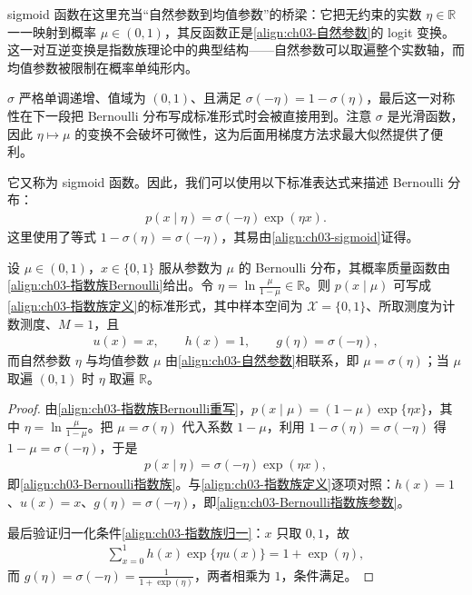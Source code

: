 \documentclass[../../main.tex]{subfiles}
\begin{document}
\begin{remark}
sigmoid 函数在这里充当“自然参数到均值参数”的桥梁：它把无约束的实数 $\eta\in\mathbb{R}$ 一一映射到概率 $\mu\in(0,1)$，其反函数正是\eqref{align:ch03-自然参数}的 logit 变换。这一对互逆变换是指数族理论中的典型结构——自然参数可以取遍整个实数轴，而均值参数被限制在概率单纯形内。

$\sigma$ 严格单调递增、值域为 $(0,1)$、且满足 $\sigma(-\eta)=1-\sigma(\eta)$，最后这一对称性在下一段把 Bernoulli 分布写成标准形式时会被直接用到。注意 $\sigma$ 是光滑函数，因此 $\eta\mapsto\mu$ 的变换不会破坏可微性，这为后面用梯度方法求最大似然提供了便利。
\end{remark}

它又称为 sigmoid 函数。因此，我们可以使用以下标准表达式来描述 Bernoulli 分布：
\begin{align}
p(x\mid\eta)=\sigma(-\eta)\exp(\eta x).
\label{align:ch03-Bernoulli指数族}
\end{align}
这里使用了等式 $1-\sigma(\eta)=\sigma(-\eta)$，其易由\eqref{align:ch03-sigmoid}证得。

\begin{proposition}\label{proposition:ch03-Bernoulli指数族}
设 $\mu\in(0,1)$，$x\in\{0,1\}$ 服从参数为 $\mu$ 的 Bernoulli 分布，其概率质量函数由\eqref{align:ch03-指数族Bernoulli}给出。令 $\eta=\ln\frac{\mu}{1-\mu}\in\mathbb{R}$。则 $p(x\mid\mu)$ 可写成\eqref{align:ch03-指数族定义}的标准形式，其中样本空间为 $\mathcal{X}=\{0,1\}$、所取测度为计数测度、$M=1$，且
\begin{align}
u(x)=x,\qquad h(x)=1,\qquad g(\eta)=\sigma(-\eta),
\label{align:ch03-Bernoulli指数族参数}
\end{align}
而自然参数 $\eta$ 与均值参数 $\mu$ 由\eqref{align:ch03-自然参数}相联系，即 $\mu=\sigma(\eta)$；当 $\mu$ 取遍 $(0,1)$ 时 $\eta$ 取遍 $\mathbb{R}$。
\end{proposition}
\begin{proof}
由\eqref{align:ch03-指数族Bernoulli重写}，$p(x\mid\mu)=(1-\mu)\exp\{\eta x\}$，其中 $\eta=\ln\frac{\mu}{1-\mu}$。把 $\mu=\sigma(\eta)$ 代入系数 $1-\mu$，利用 $1-\sigma(\eta)=\sigma(-\eta)$ 得 $1-\mu=\sigma(-\eta)$，于是
\begin{align*}
p(x\mid\eta)=\sigma(-\eta)\exp(\eta x),
\end{align*}
即\eqref{align:ch03-Bernoulli指数族}。与\eqref{align:ch03-指数族定义}逐项对照：$h(x)=1$、$u(x)=x$、$g(\eta)=\sigma(-\eta)$，即\eqref{align:ch03-Bernoulli指数族参数}。

最后验证归一化条件\eqref{align:ch03-指数族归一}：$x$ 只取 $0,1$，故
\begin{align*}
\sum_{x=0}^{1}h(x)\exp\{\eta u(x)\}=1+\exp(\eta),
\end{align*}
而 $g(\eta)=\sigma(-\eta)=\frac{1}{1+\exp(\eta)}$，两者相乘为 $1$，条件满足。
\end{proof}
\end{document}

